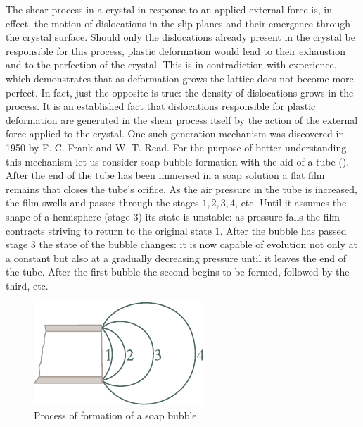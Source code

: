 The shear process in a crystal in response to an applied external force is, in effect, the motion of dislocations in the slip planes and their emergence through the crystal surface. Should only the dislocations already present in the crystal be responsible for this process, plastic deformation would lead to their exhaustion and to the perfection of the crystal. This is in contradiction with experience, which demonstrates that as deformation grows the lattice does not become more perfect. In fact, just the opposite is true: the density of dislocations grows in the process. It is an established fact that dislocations responsible for plastic deformation are generated in the shear process itself by the action of the external force applied to the crystal. One such generation mechanism was discovered in 1950 by F. C. Frank and W. T. Read. For the purpose of better understanding this mechanism let us consider soap bubble formation with the aid of a tube (). After the end of the tube has been immersed in a soap solution a flat film remains that closes the tube's orifice. As the air pressure in the tube is increased, the film swells and passes through the stages $1, 2, 3, 4$, etc. Until it assumes the shape of a hemisphere (stage $3$) its state is unstable: as pressure falls the film contracts striving to return to the original state $1$. After the bubble has passed stage $3$ the state of the bubble changes: it is now capable of evolution not only at a constant but also at a gradually decreasing pressure until it leaves the end of the tube. After the first bubble the second begins to be formed, followed by the third, etc.

\begin{figure}[t]
	\begin{center}
		\includegraphics[scale=1]{figures/ch_02/fig_2_21.pdf}
		\caption[]{Process of formation of a soap bubble.}
		\label{fig:2_21}
	\end{center}
	\vspace{-0.7cm}
\end{figure}

